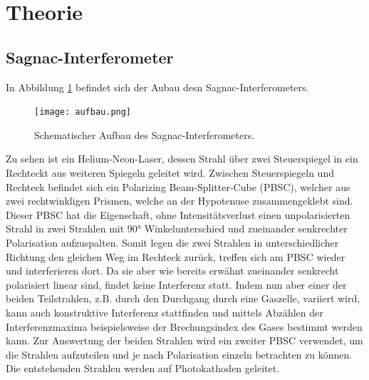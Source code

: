 \maketitle
\setcounter{page}{1}
\newpage
{}
\section{Theorie}
\subsection{Sagnac-Interferometer}
\label{sec:lol}
In Abbildung \ref{fig:1} befindet sich der Aubau desn Sagnac-Interferometers.
\begin{figure}
  \centering
  \texttt{[image: aufbau.png]}
  \caption{Schematischer Aufbau des Sagnac-Interferometers. \cite{anleitung}}
  \label{fig:1}
\end{figure}
Zu sehen ist ein Helium-Neon-Laser, dessen Strahl über zwei Steuerspiegel in
ein Rechteckt aus weiteren Spiegeln geleitet wird. Zwischen Steuerspiegeln und
Rechteck befindet sich ein Polarizing Beam-Splitter-Cube (PBSC), welcher aus zwei
rechtwinkligen Prismen, welche an der Hypotenuse zusammengeklebt sind. Dieser PBSC
hat die Eigenschaft, ohne Intensitätsverlust einen unpolarisierten Strahl in
zwei Strahlen mit 90° Winkelunterschied und zueinander senkrechter Polarisation
aufzuspalten. Somit legen die zwei Strahlen in unterschiedlicher Richtung den gleichen Weg
im Rechteck zurück, treffen sich am PBSC wieder und interferieren dort. Da sie aber
wie bereits erwähnt zueinander senkrecht polarisiert linear sind, findet keine Interferenz
statt. Indem nun aber einer der beiden Teilstrahlen, z.B. durch den Durchgang durch
eine Gaszelle, variiert wird, kann auch konstruktive Interferenz stattfinden und
mittels Abzählen der Interferenzmaxima beispielsweise der Brechungsindex des Gases
bestimmt werden kann. Zur Auswertung der beiden Strahlen wird ein zweiter PBSC
verwendet, um die Strahlen aufzuteilen und je nach Polarisation einzeln betrachten
zu können. Die entstehenden Strahlen werden auf Photokathoden geleitet.

